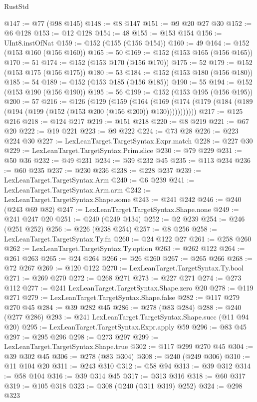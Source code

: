 \begin{lexlean}{RustStd}
\begin{coremodule}
@147 := @77 (@98 @145)
@148 := @8 @147
@151 := @9 @20 @27 @30
@152 := @6 @128
@153 := @12 @128
@154 := 48
@155 := @153 @154
@156 := UInt8.instOfNat
@159 := @152 (@155 (@156 @154))
@160 := 49
@164 := @152 (@153 @160 (@156 @160))
@165 := 50
@169 := @152 (@153 @165 (@156 @165))
@170 := 51
@174 := @152 (@153 @170 (@156 @170))
@175 := 52
@179 := @152 (@153 @175 (@156 @175))
@180 := 53
@184 := @152 (@153 @180 (@156 @180))
@185 := 54
@189 := @152 (@153 @185 (@156 @185))
@190 := 55
@194 := @152 (@153 @190 (@156 @190))
@195 := 56
@199 := @152 (@153 @195 (@156 @195))
@200 := 57
@216 := @126
    (@129
      (@159
        (@164
          (@169 (@174 (@179 (@184 (@189 (@194 (@199 (@152 (@153 @200 (@156 @200)) @130)))))))))))
@217 := @125 @216
@218 := @124 @217
@219 := @151 @218
@220 := @8 @219
@221 := @67 @20
@222 := @19 @221
@223 := @9 @222
@224 := @73 @28
@226 := @223 @224 @30
@227 := LexLeanTarget.TargetSyntax.Expr.match
@228 := @227 @30
@229 := LexLeanTarget.TargetSyntax.Prim.slice
@230 := @79 @229
@231 := @50 @36
@232 := @49 @231
@234 := @39 @232 @45
@235 := @113 @234
@236 := @60 @235
@237 := @230 @236
@238 := @228 @237
@239 := LexLeanTarget.TargetSyntax.Arm
@240 := @6 @239
@241 := LexLeanTarget.TargetSyntax.Arm.arm
@242 := LexLeanTarget.TargetSyntax.Shape.some
@243 := @241 @242
@246 := @240 (@243 @69 @82)
@247 := LexLeanTarget.TargetSyntax.Shape.none
@249 := @241 @247 @20
@251 := @240 (@249 @134)
@252 := @2 @239
@254 := @246 (@251 @252)
@256 := @226 (@238 @254)
@257 := @8 @256
@258 := LexLeanTarget.TargetSyntax.Ty.fn
@260 := @24 @122 @27
@261 := @258 @260
@262 := LexLeanTarget.TargetSyntax.Ty.option
@263 := @262 @122
@264 := @261 @263
@265 := @24 @264
@266 := @26 @260
@267 := @265 @266
@268 := @72 @267
@269 := @120 @122
@270 := LexLeanTarget.TargetSyntax.Ty.bool
@271 := @269 @270
@272 := @268 @271
@273 := @227 @271
@274 := @273 @112
@277 := @241 LexLeanTarget.TargetSyntax.Shape.zero @20
@278 := @119 @271
@279 := LexLeanTarget.TargetSyntax.Shape.false
@282 := @117 @279 @270 @45
@284 := @39 @282 @45
@286 := @278 (@83 @284)
@288 := @240 (@277 @286)
@293 := @241 LexLeanTarget.TargetSyntax.Shape.succ (@11 @94 @20)
@295 := LexLeanTarget.TargetSyntax.Expr.apply @59
@296 := @83 @45
@297 := @295 @296
@298 := @273 @297
@299 := LexLeanTarget.TargetSyntax.Shape.true
@302 := @117 @299 @270 @45
@304 := @39 @302 @45
@306 := @278 (@83 @304)
@308 := @240 (@249 @306)
@310 := @11 @104 @20
@311 := @243 @310
@312 := @58 @94
@313 := @39 @312
@314 := @58 @104
@316 := @39 @314 @45
@317 := @313 @316
@318 := @60 @317
@319 := @105 @318
@323 := @308 (@240 (@311 @319) @252)
@324 := @298 @323

\end{coremodule}
\end{lexlean}
